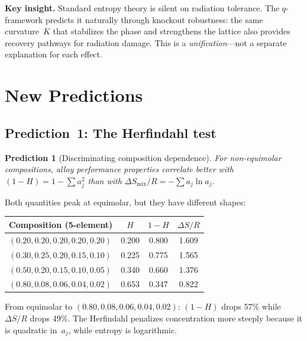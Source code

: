 \documentclass[12pt,letterpaper]{article}
\newtheorem{prediction}[theorem]{Prediction}
\theoremstyle{definition}
\begin{document}
\begin{mdframed}
\textbf{Key insight.}  Standard entropy theory is silent on radiation tolerance.  The $q$-framework predicts it naturally through knockout robustness: the same curvature~$K$ that stabilizes the phase and strengthens the lattice also provides recovery pathways for radiation damage.  This is a \emph{unification}---not a separate explanation for each effect.
\end{mdframed}


\section{New Predictions}

\subsection{Prediction~1: The Herfindahl test}

\begin{prediction}[Discriminating composition dependence]\label{pred:H_vs_S}
For non-equimolar compositions, alloy performance properties correlate better with $(1 - H) = 1 - \sum a_j^2$ than with $\Delta S_{\mathrm{mix}} / R = -\sum a_j \ln a_j$.
\end{prediction}

Both quantities peak at equimolar, but they have different shapes:

\begin{center}
\begin{tabular}{@{}lccc@{}}
\toprule
Composition (5-element) & $H$ & $1 - H$ & $\Delta S/R$ \\
\midrule
$(0.20, 0.20, 0.20, 0.20, 0.20)$ & 0.200 & 0.800 & 1.609 \\
$(0.30, 0.25, 0.20, 0.15, 0.10)$ & 0.225 & 0.775 & 1.565 \\
$(0.50, 0.20, 0.15, 0.10, 0.05)$ & 0.340 & 0.660 & 1.376 \\
$(0.80, 0.08, 0.06, 0.04, 0.02)$ & 0.653 & 0.347 & 0.822 \\
\bottomrule
\end{tabular}
\end{center}

From equimolar to $(0.80, 0.08, 0.06, 0.04, 0.02)$: $(1-H)$ drops 57\% while $\Delta S/R$ drops 49\%.  The Herfindahl penalizes concentration more steeply because it is quadratic in~$a_j$, while entropy is logarithmic.
\end{document}
